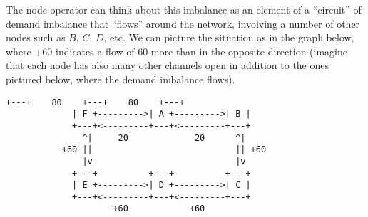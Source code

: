\documentclass[a4paper]{article}
\begin{document}
The node operator can think about this imbalance as an element of a ``circuit'' of demand imbalance that ``flows'' around the network, involving a number of other nodes such as $B$, $C$, $D$, etc. We can picture the situation as in the graph below, where +60 indicates a flow of 60 more than in the opposite direction (imagine that each node has also many other channels open in addition to the ones pictured below, where the demand imbalance flows).

\begin{Verbatim}[samepage=true]
             +---+    80    +---+    80    +---+
             | F +--------->| A +--------->| B |
             +---+<---------+---+<---------+---+
               ^|     20             20      ^|
           +60 ||                            || +60
               |v                            |v
             +---+          +---+          +---+
             | E +--------->| D +--------->| C |
             +---+<---------+---+<---------+---+
                     +60            +60
\end{Verbatim}
\end{document}
